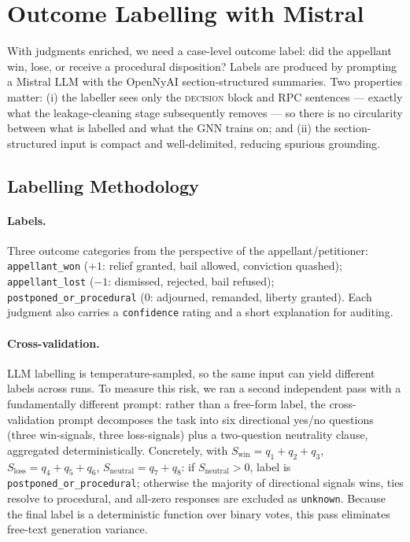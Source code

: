 \section{Outcome Labelling with Mistral}
\label{sec:mistral_labelling}

With judgments enriched, we need a case-level outcome label: did the appellant win, lose, or receive a procedural disposition? Labels are produced by prompting a Mistral LLM with the OpenNyAI section-structured summaries. Two properties matter: (i) the labeller sees only the \textsc{decision} block and \textsc{RPC} sentences --- exactly what the leakage-cleaning stage subsequently removes --- so there is no circularity between what is labelled and what the GNN trains on; and (ii) the section-structured input is compact and well-delimited, reducing spurious grounding.

\subsection{Labelling Methodology}

\paragraph{Labels.} Three outcome categories from the perspective of the appellant/petitioner: \texttt{appellant\_won} ($+1$: relief granted, bail allowed, conviction quashed); \texttt{appellant\_lost} ($-1$: dismissed, rejected, bail refused); \texttt{postponed\_or\_procedural} ($0$: adjourned, remanded, liberty granted). Each judgment also carries a \texttt{confidence} rating and a short explanation for auditing.

\paragraph{Cross-validation.} LLM labelling is temperature-sampled, so the same input can yield different labels across runs. To measure this risk, we ran a second independent pass with a fundamentally different prompt: rather than a free-form label, the cross-validation prompt decomposes the task into six directional yes/no questions (three win-signals, three loss-signals) plus a two-question neutrality clause, aggregated deterministically. Concretely, with $S_\text{win}=q_1+q_2+q_3$, $S_\text{loss}=q_4+q_5+q_6$, $S_\text{neutral}=q_7+q_8$: if $S_\text{neutral}>0$, label is \texttt{postponed\_or\_procedural}; otherwise the majority of directional signals wins, ties resolve to procedural, and all-zero responses are excluded as \texttt{unknown}. Because the final label is a deterministic function over binary votes, this pass eliminates free-text generation variance.

